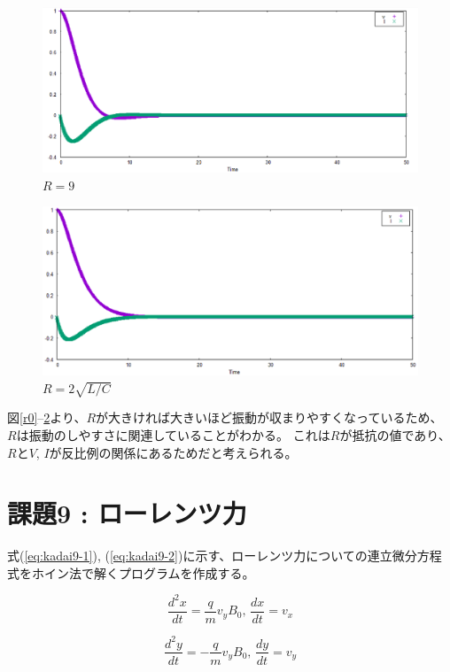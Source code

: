 \documentclass[a4j,titlepage]{jsarticle}
\begin{document}
\begin{figure}[H]
\centering
\includegraphics[scale=0.7]{./img/kadai7_R9.eps}
\caption{$R=9$}
\label{r9}
\end{figure}

\begin{figure}[H]
\centering
\includegraphics[scale=0.7]{./img/kadai7_sqr.eps}
\caption{$R=2\sqrt{L/C}$}
\label{rsqr}
\end{figure}

図\ref{r0}--\ref{rsqr}より、$R$が大きければ大きいほど振動が収まりやすくなっているため、
$R$は振動のしやすさに関連していることがわかる。
これは$R$が抵抗の値であり、$R$と$V$, $I$が反比例の関係にあるためだと考えられる。


\section{課題9 : ローレンツ力}
式(\ref{eq:kadai9-1}), (\ref{eq:kadai9-2})に示す、ローレンツ力についての連立微分方程式をホイン法で解くプログラムを作成する。

\begin{equation}
  \frac{d^2 x}{dt} = \frac{q}{m} v_y B_0 ,\, \frac{dx}{dt} = v_x
  \label{eq:kadai9-1}
\end{equation}

\begin{equation}
  \frac{d^2 y}{dt} = - \frac{q}{m} v_y B_0 ,\, \frac{dy}{dt} = v_y
  \label{eq:kadai9-2}
\end{equation}
\end{document}
